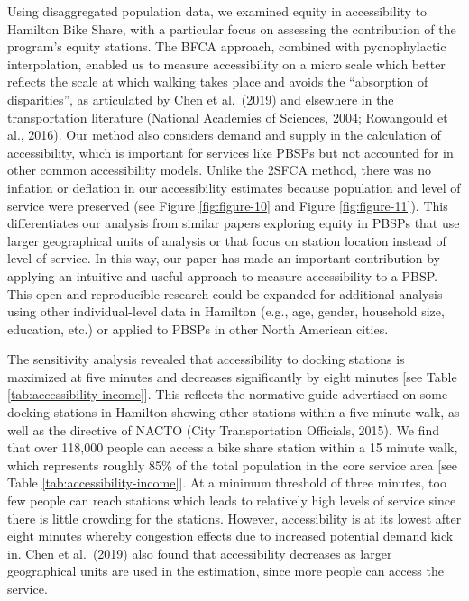 \documentclass[]{elsarticle} %
\begin{document}
Using disaggregated population data, we examined equity in accessibility
to Hamilton Bike Share, with a particular focus on assessing the
contribution of the program's equity stations. The BFCA approach,
combined with pycnophylactic interpolation, enabled us to measure
accessibility on a micro scale which better reflects the scale at which
walking takes place and avoids the ``absorption of disparities'', as
articulated by Chen et al.~(2019) and elsewhere in the transportation
literature (National Academies of Sciences, 2004; Rowangould et al.,
2016). Our method also considers demand and supply in the calculation of
accessibility, which is important for services like PBSPs but not
accounted for in other common accessibility models. Unlike the 2SFCA
method, there was no inflation or deflation in our accessibility
estimates because population and level of service were preserved (see
Figure \ref{fig:figure-10} and Figure \ref{fig:figure-11}). This
differentiates our analysis from similar papers exploring equity in
PBSPs that use larger geographical units of analysis or that focus on
station location instead of level of service. In this way, our paper has
made an important contribution by applying an intuitive and useful
approach to measure accessibility to a PBSP. This open and reproducible
research could be expanded for additional analysis using other
individual-level data in Hamilton (e.g., age, gender, household size,
education, etc.) or applied to PBSPs in other North American cities.

The sensitivity analysis revealed that accessibility to docking stations
is maximized at five minutes and decreases significantly by eight
minutes {[}see Table \ref{tab:accessibility-income}{]}. This reflects
the normative guide advertised on some docking stations in Hamilton
showing other stations within a five minute walk, as well as the
directive of NACTO (City Transportation Officials, 2015). We find that
over 118,000 people can access a bike share station within a 15 minute
walk, which represents roughly 85\% of the total population in the core
service area {[}see Table \ref{tab:accessibility-income}{]}. At a
minimum threshold of three minutes, too few people can reach stations
which leads to relatively high levels of service since there is little
crowding for the stations. However, accessibility is at its lowest after
eight minutes whereby congestion effects due to increased potential
demand kick in. Chen et al.~(2019) also found that accessibility
decreases as larger geographical units are used in the estimation, since
more people can access the service.
\end{document}
